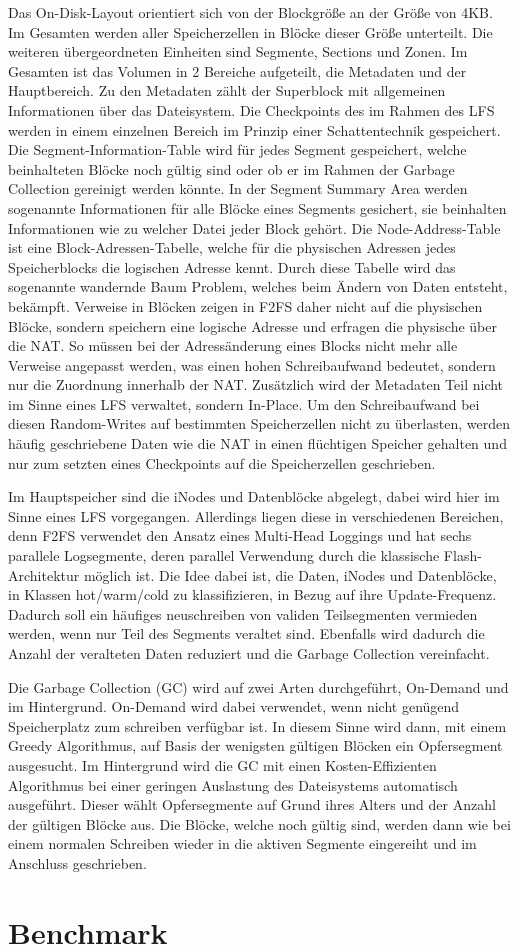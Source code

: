 \documentclass[11pt]{article}
\begin{document}
Das On-Disk-Layout orientiert sich von der Blockgröße an der Größe von 4KB. Im Gesamten werden aller Speicherzellen in Blöcke dieser Größe unterteilt. Die weiteren übergeordneten Einheiten sind Segmente, Sections und Zonen. Im Gesamten ist das Volumen in 2 Bereiche aufgeteilt, die Metadaten und der Hauptbereich. Zu den Metadaten zählt der Superblock mit allgemeinen Informationen über das Dateisystem.
Die Checkpoints des im Rahmen des LFS werden in einem einzelnen Bereich im Prinzip einer Schattentechnik gespeichert.
Die Segment-Information-Table wird für jedes Segment gespeichert, welche beinhalteten Blöcke noch gültig sind oder ob er im Rahmen der Garbage Collection gereinigt werden könnte.
In der Segment Summary Area werden sogenannte Informationen für alle Blöcke eines Segments gesichert, sie beinhalten Informationen wie zu welcher Datei jeder Block gehört.
Die Node-Address-Table ist eine Block-Adressen-Tabelle, welche für die physischen Adressen jedes Speicherblocks die logischen Adresse kennt. Durch diese Tabelle wird das sogenannte wandernde Baum Problem, welches beim Ändern von Daten entsteht, bekämpft. Verweise in Blöcken zeigen in F2FS daher nicht auf die physischen Blöcke, sondern speichern eine logische Adresse und erfragen die physische über die NAT. So müssen bei der Adressänderung eines Blocks nicht mehr alle Verweise angepasst werden, was einen hohen Schreibaufwand bedeutet, sondern nur die Zuordnung innerhalb der NAT. Zusätzlich wird der Metadaten Teil nicht im Sinne eines LFS verwaltet, sondern In-Place. Um den Schreibaufwand bei diesen Random-Writes auf bestimmten Speicherzellen nicht zu überlasten, werden häufig geschriebene Daten wie die NAT in einen flüchtigen Speicher gehalten und nur zum setzten eines Checkpoints auf die Speicherzellen geschrieben.

Im Hauptspeicher sind die iNodes und Datenblöcke abgelegt, dabei wird hier im Sinne eines LFS vorgegangen. Allerdings liegen diese in verschiedenen Bereichen, denn F2FS verwendet den Ansatz eines Multi-Head Loggings und hat sechs parallele Logsegmente, deren parallel Verwendung durch die klassische Flash-Architektur möglich ist. Die Idee dabei ist, die Daten, iNodes und Datenblöcke, in Klassen hot/warm/cold zu klassifizieren, in Bezug auf ihre Update-Frequenz. Dadurch soll ein häufiges neuschreiben von validen Teilsegmenten vermieden werden, wenn nur Teil des Segments veraltet sind. Ebenfalls wird dadurch die Anzahl der veralteten Daten reduziert und die Garbage Collection vereinfacht.

Die Garbage Collection (GC) wird auf zwei Arten durchgeführt, On-Demand und im Hintergrund. On-Demand wird dabei verwendet, wenn nicht genügend Speicherplatz zum schreiben verfügbar ist. In diesem Sinne wird dann, mit einem Greedy Algorithmus, auf Basis der wenigsten gültigen Blöcken ein Opfersegment ausgesucht. Im Hintergrund wird die GC mit einen Kosten-Effizienten Algorithmus bei einer geringen Auslastung des Dateisystems automatisch ausgeführt. Dieser wählt Opfersegmente auf Grund ihres Alters und der Anzahl der gültigen Blöcke aus. Die Blöcke, welche noch gültig sind, werden dann wie bei einem normalen Schreiben wieder in die aktiven Segmente eingereiht und im Anschluss geschrieben.


\section{Benchmark}



\end{document}
